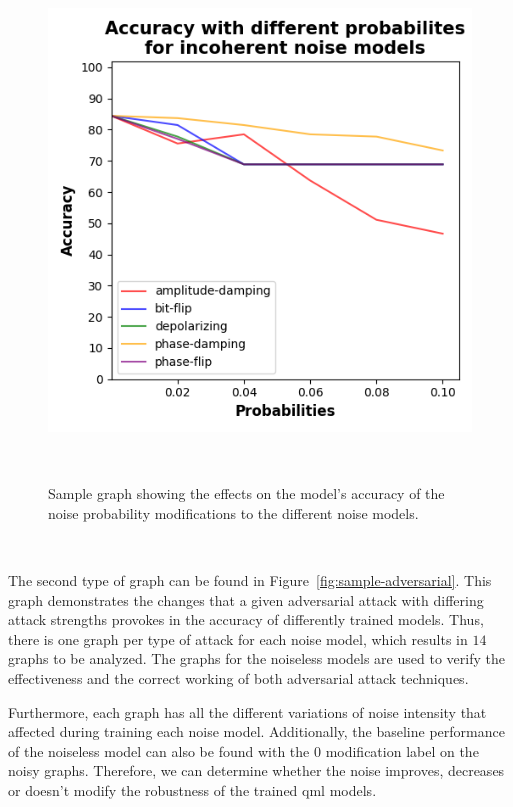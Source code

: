 \begin{figure}[h!]
  \includegraphics[scale=0.70]{figures/accuracy-graph.png}
  \centering
  \caption{Sample graph showing the effects on the model's accuracy of the noise probability modifications to the different noise models.}
~\label{fig:sample-accuracy}
\end{figure} \

The second type of graph can be found in Figure~\ref{fig:sample-adversarial}.
This graph demonstrates the changes that a given adversarial attack with
differing attack strengths provokes in the accuracy of differently trained
models. Thus, there is one graph per type of attack for each noise model,
which results in \(14\) graphs to be analyzed. The graphs for the
noiseless models are used to verify the effectiveness and the
correct working of both adversarial attack techniques. \

Furthermore, each graph has all the different variations of noise intensity
that affected during training each noise model. Additionally, the baseline
performance of the noiseless model can also be found with the \(0\) modification
label on the noisy graphs. Therefore, we can determine whether the noise
improves, decreases or doesn't modify the robustness of the trained \ac{qml}
models. \

